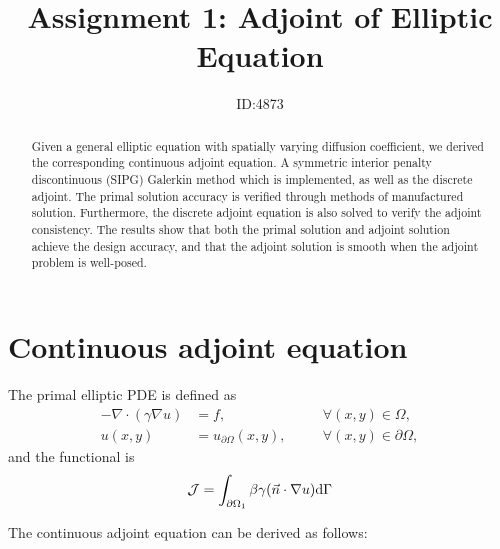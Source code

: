 \documentclass[a4paper]{article}
\title{Assignment 1: Adjoint of Elliptic Equation}
\author{ID:4873}
\begin{document}
 \maketitle
 
\begin{abstract}
   Given a general elliptic equation with spatially varying diffusion coefficient, we derived the corresponding continuous adjoint equation. A symmetric interior penalty discontinuous (SIPG) Galerkin method which is implemented, as well as the discrete adjoint. The primal solution accuracy is verified through methods of manufactured solution. Furthermore, the discrete adjoint equation is also solved to verify the adjoint consistency. The results show that both the primal solution and adjoint solution achieve the design accuracy, and that the adjoint solution is smooth when the adjoint problem is well-posed. 
\end{abstract}

\section{Continuous adjoint equation} \label{sec:con_adj}
The primal elliptic PDE is defined as
\begin{equation} \label{eq:primal_pde}
\begin{aligned}
-\nabla\cdot (\gamma\nabla u) &= f,	\quad && \forall(x,y)\in\Omega, \\
u(x,y) &= u_{\partial\Omega}(x,y), \quad&&\forall(x,y)\in\partial\Omega,
\end{aligned}
\end{equation}
and the functional is 
\begin{equation}\label{eq:functional}
\begin{aligned}
\mathcal{J}=\int_{\partial\Omega_{1}}\beta\gamma(\vec{n}\cdot\nabla u) \mathrm{d} \Gamma
\end{aligned}
\end{equation}

The continuous adjoint equation can be derived as follows:
\end{document}
